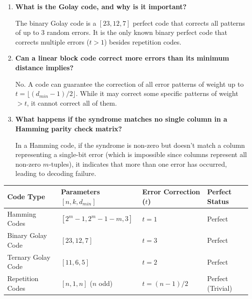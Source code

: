 \documentclass[12pt,a4paper]{article}
\newcommand{\Q}[1]{\textbf{#1}\par\noindent\ignorespaces}
\renewcommand{\arraystretch}{1.45}
\begin{document}
\begin{tcolorbox}[exambox, title={\textbf{Frequently Asked / Viva Questions}}]
\begin{enumerate}[topsep=0pt, label=\textbf{Q\arabic*.}, itemsep=5pt]
  \item \Q{What is the Golay code, and why is it important?}
    The binary Golay code is a $[23, 12, 7]$ perfect code that corrects all patterns of up to $3$ random errors. It is the only known binary perfect code that corrects multiple errors ($t > 1$) besides repetition codes.
  \item \Q{Can a linear block code correct more errors than its minimum distance implies?}
    No. A code can guarantee the correction of all error patterns of weight up to $t = \lfloor(d_{min}-1)/2\rfloor$. While it may correct some specific patterns of weight $> t$, it cannot correct all of them.
  \item \Q{What happens if the syndrome matches no single column in a Hamming parity check matrix?}
    In a Hamming code, if the syndrome is non-zero but doesn't match a column representing a single-bit error (which is impossible since columns represent all non-zero $m$-tuples), it indicates that more than one error has occurred, leading to decoding failure.
\end{enumerate}
\end{tcolorbox}

\vspace{6pt}

\begin{tcolorbox}[tikzbox, title={\textbf{Comparison of Perfect and Near-Perfect Block Codes}}]
\renewcommand{\arraystretch}{1.45}
\begin{tabularx}{\linewidth}{|B{3.2cm}|Y|Y|Y|}
\hline
\textbf{Code Type} & \textbf{Parameters $[n, k, d_{min}]$} & \textbf{Error Correction ($t$)} & \textbf{Perfect Status} \\
\hline
Hamming Codes & $[2^m-1, 2^m-1-m, 3]$ & $t = 1$ & Perfect \\
\hline
Binary Golay Code & $[23, 12, 7]$ & $t = 3$ & Perfect \\
\hline
Ternary Golay Code & $[11, 6, 5]$ & $t = 2$ & Perfect \\
\hline
Repetition Codes & $[n, 1, n]$ ($n$ odd) & $t = (n-1)/2$ & Perfect (Trivial) \\
\hline
\end{tabularx}
\end{tcolorbox}
\end{document}
